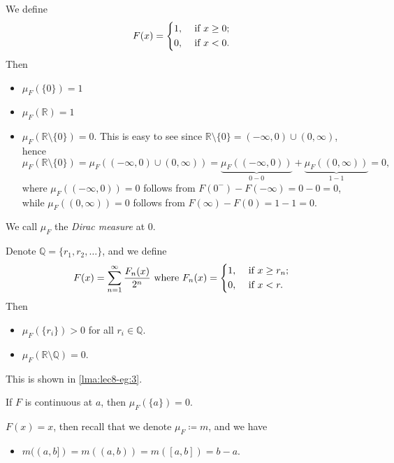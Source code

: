 \begin{eg}
	We define
	\[
		F(x) = \begin{dcases}
			1, & \text{ if } x\geq 0 ; \\
			0, & \text{ if } x<0.
		\end{dcases}
	\]
	Then
	\begin{itemize}
		\item \(\mu _F(\{0\})=1\)
		\item \(\mu _F(\mathbb{R} ) = 1\)
		\item \(\mu _F(\mathbb{R}\setminus \{0\} ) = 0\). This is easy to see since \(\mathbb{R} \setminus \{0\} = (-\infty , 0)\cup (0, \infty )\), hence
		      \[
			      \mu _F(\mathbb{R} \setminus \{0\}) = \mu _F((-\infty , 0)\cup (0, \infty ))
			      = \underbrace{\mu _F((-\infty , 0))}_{0 - 0} + \underbrace{\mu _F((0, \infty ))}_{1 -1 }= 0,
		      \]
		      where \(\mu _{F} ((-\infty , 0)) = 0\) follows from \(F(0^-) - F(-\infty ) = 0 - 0 = 0\), while
		      \(\mu _{F} ((0, \infty ))=0\) follows from \(F(\infty ) - F(0) = 1 - 1 = 0\).
	\end{itemize}
	We call \(\mu _F\) the \emph{Dirac measure} at \(0\).
\end{eg}

\begin{eg}\label{eg:lec8-3}
	Denote \(\mathbb{Q} = \{r_1, r_2, \dots  \}\), and we define
	\[
		F(x) = \sum_{n=1}^{\infty} \frac{F_n(x)}{2^n} \text{ where }  F_{n}(x) = \begin{dcases}
			1, & \text{ if } x\geq r_n; \\
			0, & \text{ if } x<r.       \\
		\end{dcases}
	\]
	Then
	\begin{itemize}
		\item \(\mu _F(\{r_{i}\})>0\) for all \(r_{i}\in\mathbb{Q} \).
		\item \(\mu _F(\mathbb{R} \setminus \mathbb{Q} ) = 0\).
	\end{itemize}
	This is shown in \autoref{lma:lec8-eg:3}.
\end{eg}

\begin{eg}
	If \(F\) is continuous at \(a\), then \(\mu _F(\{a\}) = 0\).
\end{eg}

\begin{eg}
	\(F(x) = x\), then recall that we denote \(\mu _F \coloneqq m\), and we have
	\begin{itemize}
		\item \( m((a, b]) = m((a, b)) = m([a, b]) = b - a\).
	\end{itemize}
\end{eg}

